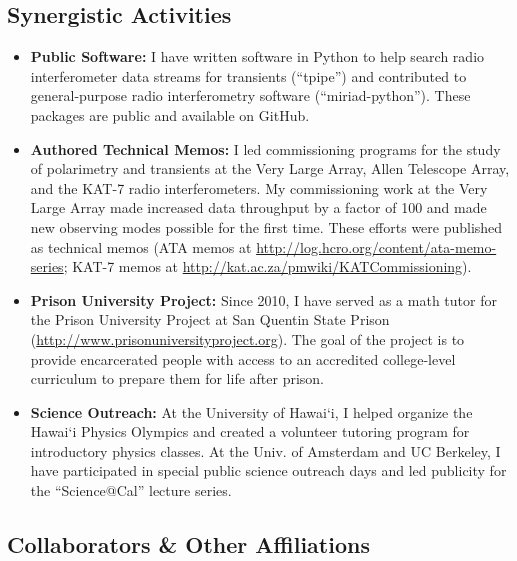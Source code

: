 \documentclass[11pt]{article}
\begin{document}
\subsection*{Synergistic Activities}

\begin{itemize}
 \item {\bf Public Software:} I have written software in Python to help search radio interferometer data streams for transients (``tpipe'') and contributed to general-purpose radio interferometry software (``miriad-python''). These packages are public and available on GitHub.

 \item {\bf Authored Technical Memos:} I led commissioning programs for the study of polarimetry and transients at the Very Large Array, Allen Telescope Array, and the KAT-7 radio interferometers. My commissioning work at the Very Large Array made increased data throughput by a factor of 100 and made new observing modes possible for the first time. These efforts were published as technical memos (ATA memos at \url{http://log.hcro.org/content/ata-memo-series}; KAT-7 memos at \url{http://kat.ac.za/pmwiki/KATCommissioning}).

 \item {\bf Prison University Project:} Since 2010, I have served as a math tutor for the Prison University Project at San Quentin State Prison (\url{http://www.prisonuniversityproject.org}). The goal of the project is to provide encarcerated people with access to an accredited college-level curriculum to prepare them for life after prison.

 \item {\bf Science Outreach:} At the University of Hawai`i, I helped organize the Hawai`i Physics Olympics and created a volunteer tutoring program for introductory physics classes. At the Univ. of Amsterdam and UC Berkeley, I have participated in special public science outreach days and led publicity for the ``Science@Cal'' lecture series.

\end{itemize}

\subsection*{Collaborators \& Other Affiliations}
\indent
\end{document}
